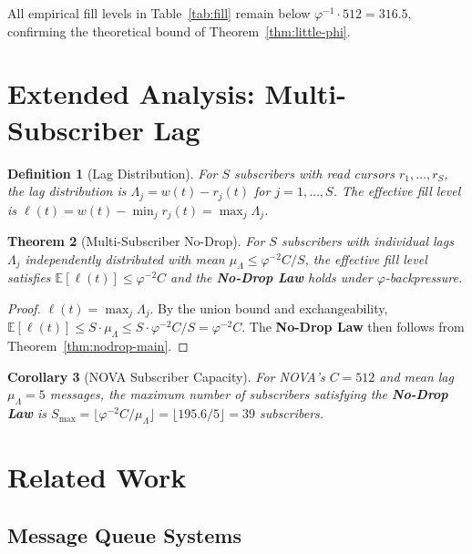 \documentclass[12pt]{article}
\newtheorem{theorem}{Theorem}
\newtheorem{corollary}[theorem]{Corollary}
\newtheorem{definition}[theorem]{Definition}
\newcommand{\PHIINV}{\varphi^{-1}}
\newcommand{\AMOR}{\varphi^{-2}}
\newcommand{\E}{\mathbb{E}}
\newcommand{\SCAP}{C}
\newcommand{\NoDrop}{\textbf{No-Drop Law}}
\begin{document}
All empirical fill levels in Table~\ref{tab:fill} remain below $\PHIINV \cdot
512 = 316.5$, confirming the theoretical bound of
Theorem~\ref{thm:little-phi}.

\section{Extended Analysis: Multi-Subscriber Lag}
\label{sec:multisubscriber}

\begin{definition}[Lag Distribution]
For $S$ subscribers with read cursors $r_1, \ldots, r_S$, the
\emph{lag distribution} is $\Lambda_j = w(t) - r_j(t)$ for $j = 1, \ldots, S$.
The \emph{effective fill level} is $\ell(t) = w(t) - \min_j r_j(t) = \max_j
\Lambda_j$.
\end{definition}

\begin{theorem}[Multi-Subscriber No-Drop]
\label{thm:multi-sub}
For $S$ subscribers with individual lags $\Lambda_j$ independently distributed
with mean $\mu_\Lambda \le \AMOR \SCAP / S$, the effective fill level satisfies
$\E[\ell(t)] \le \AMOR \SCAP$ and the \NoDrop{} holds under
$\varphi$-backpressure.
\end{theorem}

\begin{proof}
$\ell(t) = \max_j \Lambda_j$.  By the union bound and exchangeability,
$\E[\ell(t)] \le S \cdot \mu_\Lambda \le S \cdot \AMOR \SCAP / S = \AMOR \SCAP$.
The \NoDrop{} then follows from Theorem~\ref{thm:nodrop-main}.
\end{proof}

\begin{corollary}[NOVA Subscriber Capacity]
For NOVA's $\SCAP = 512$ and mean lag $\mu_\Lambda = 5$ messages, the maximum
number of subscribers satisfying the \NoDrop{} is
$S_{\max} = \lfloor \AMOR \SCAP / \mu_\Lambda \rfloor = \lfloor 195.6 / 5
\rfloor = 39$ subscribers.
\end{corollary}

\section{Related Work}
\label{sec:related}

\subsection{Message Queue Systems}
\end{document}
